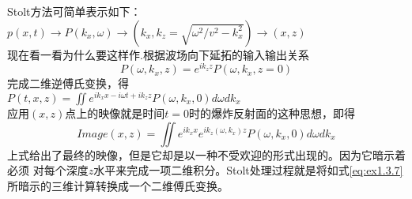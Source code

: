 Stolt方法可简单表示如下：\\
$p(x,t)\rightarrow P(k_x,\omega)\rightarrow(k_x,k_z=\sqrt{\omega^2/v^2-k_x^2})\rightarrow(x,z)$\\
现在看一看为什么要这样作.根据波场向下延拓的输入输出关系
\begin{equation}
P(\omega,k_x,z)=e^{ik_zz}P(\omega,k_x,z=0)
\label{eq:ex1.3.6}
\end{equation}
完成二维逆傅氏变换，得 \\
$P(t,x,z)=\iint e^{ik_xx-i\omega t+ik_zz}P(\omega,k_x,0)d\omega dk_x$\\
应用$(x,z)$点上的映像就是时间$t=0$时的爆炸反射面的这种思想，即得
\begin{equation}
Image(x,z)=\iint e^{ik_xx}e^{ik_z(\omega,k_x)z}P(\omega,k_x,0)d\omega dk_x
\label{eq:ex1.3.7}
\end{equation}
上式给出了最终的映像，但是它却是以一种不受欢迎的形式出现的。因为它暗示着必须
对每个深度$z$水平来完成一项二维积分。Stolt处理过程就是将如式\ref{eq:ex1.3.7}
所暗示的三维计算转换成一个二维傅氏变换。

